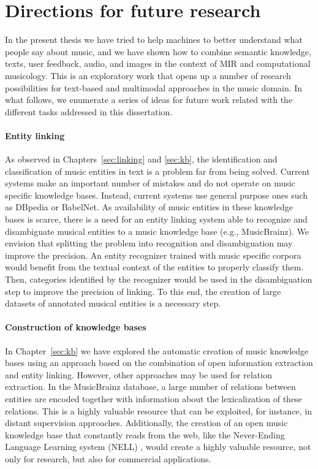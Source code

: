 \section{Directions for future research}
\label{sec:conclusion:future}

In the present thesis we have tried to help machines to better understand what people say about music, and we have shown how to combine semantic knowledge, texts, user feedback, audio, and images in the context of MIR and computational musicology. This is an exploratory work that opens up a number of research possibilities for text-based and multimodal approaches in the music domain. In what follows, we enumerate a series of ideas for future work related with the different tasks addressed in this dissertation.

\paragraph{Entity linking} As observed in Chapters~\ref{sec:linking} and \ref{sec:kb}, the identification and classification of music entities in text is a problem far from being solved. Current systems make an important number of mistakes and do not operate on music specific knowledge bases. Instead, current systems use general purpose ones such as DBpedia or BabelNet. As availability of music entities in these knowledge bases is scarce, there is a need for an entity linking system able to recognize and disambiguate musical entities to a music knowledge base (e.g., MusicBrainz). We envision that splitting the problem into recognition and disambiguation may improve the precision. An entity recognizer trained with music specific corpora would benefit from the textual context of the entities to properly classify them. Then, categories identified by the recognizer would be used in the disambiguation step to improve the precision of linking. To this end, the creation of large datasets of annotated musical entities is a necessary step. %

\paragraph{Construction of knowledge bases} In Chapter~\ref{sec:kb} we have explored the automatic creation of music knowledge bases using an approach based on the combination of open information extraction and entity linking. However, other approaches may be used for relation extraction. In the MusicBrainz database,  a large number of relations between entities are encoded together with information about the lexicalization of these relations. This is a highly valuable resource that can be exploited, for instance, in distant supervision approaches. Additionally, the creation of an open music knowledge base that constantly reads from the web, like the Never-Ending Language Learning system (NELL) \citep{Carlson2010a}, would create a highly valuable resource, not only for research, but also for commercial applications.

